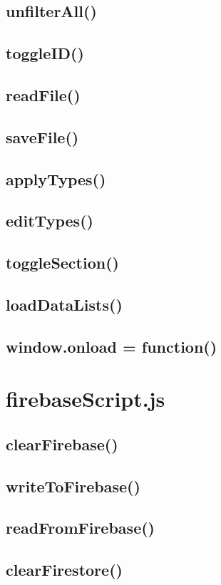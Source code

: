 \documentclass[letterpaper]{article}
\begin{document}
\subsection{unfilterAll()}
\subsection{toggleID()}
\subsection{readFile()}
\subsection{saveFile()}
\subsection{applyTypes()}
\subsection{editTypes()}
\subsection{toggleSection()}
\subsection{loadDataLists()}
\subsection{window.onload = function()}

\newpage

\section{firebaseScript.js}

\subsection{clearFirebase()}
\subsection{writeToFirebase()}
\subsection{readFromFirebase()}
\subsection{clearFirestore()}
\end{document}
